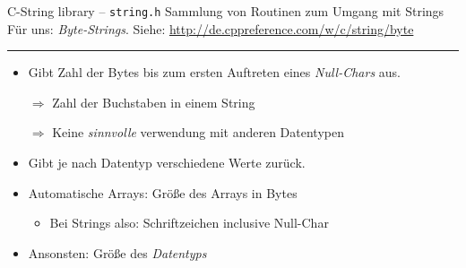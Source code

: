 
\begin{frame}[fragile]{C-String library -- \texttt{string.h}}
%
%
Sammlung von Routinen zum Umgang mit Strings\newline
Für uns: \emph{Byte-Strings}. Siehe: \url{http://de.cppreference.com/w/c/string/byte}
\begin{center}		%
\hrule				%
\end{center}
%
\begin{tcolorbox}[title=\texttt{strlen}, height=4.7cm]
\begin{itemize}
\item Gibt Zahl der Bytes bis zum ersten Auftreten eines \emph{Null-Chars} aus.
\item[$\Rightarrow$] Zahl der Buchstaben in einem String
\item[$\Rightarrow$] Keine \emph{sinnvolle} verwendung mit anderen Datentypen
\end{itemize}
\end{tcolorbox}
%
\begin{tcolorbox}[title=\texttt{sizeof}, height=4.7cm]
\begin{itemize}
\item Gibt je nach Datentyp verschiedene Werte zurück.
\item Automatische Arrays: Größe des Arrays in Bytes
	\begin{itemize}
	\item Bei Strings also: Schriftzeichen inclusive Null-Char
	\end{itemize}
\item Ansonsten: Größe des \emph{Datentyps}
\end{itemize}
\end{tcolorbox}
%
\end{frame}


